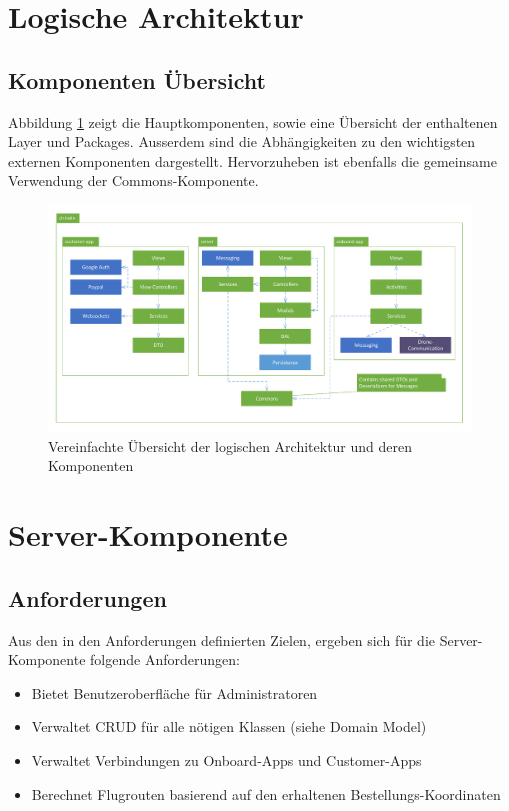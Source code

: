 \section{Logische Architektur}

\subsection{Komponenten Übersicht}

Abbildung \ref{fig:logical-architecture-overview} zeigt die Hauptkomponenten, sowie eine Übersicht der enthaltenen Layer und Packages. Ausserdem sind die Abhängigkeiten zu den wichtigsten externen Komponenten dargestellt. Hervorzuheben ist ebenfalls die gemeinsame Verwendung der Commons-Komponente. 

\begin{figure}[H]
	\includegraphics[width=1.0\textwidth]{images/logical-architecture-overview.pdf}
	\caption{Vereinfachte Übersicht der logischen Architektur und deren Komponenten }
	\label{fig:logical-architecture-overview}
\end{figure}

\section{Server-Komponente}

\subsection{Anforderungen}
Aus den in den Anforderungen definierten Zielen, ergeben sich für die Server-Komponente folgende Anforderungen:

\begin{itemize}
	\item Bietet Benutzeroberfläche für Administratoren
	\item Verwaltet \Gls{CRUD} für alle nötigen Klassen (siehe Domain Model)
	\item Verwaltet Verbindungen zu Onboard-Apps und Customer-Apps
	\item Berechnet Flugrouten basierend auf den erhaltenen Bestellungs-Koordinaten
\end{itemize}

